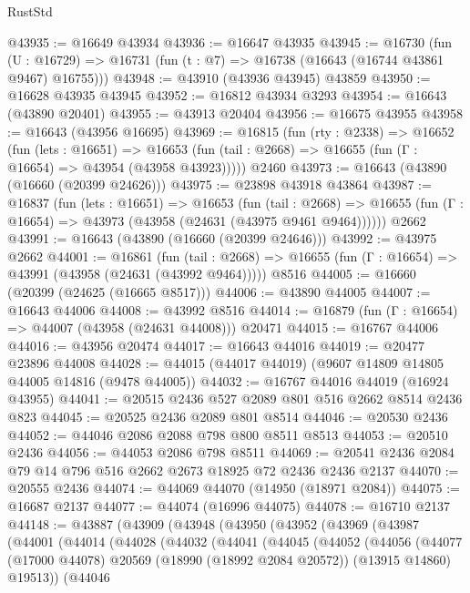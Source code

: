 \begin{lexlean}{RustStd}
\begin{coremodule}
@43935 := @16649 @43934
@43936 := @16647 @43935
@43945 := @16730
    (fun (U : @16729) => @16731 (fun (t : @7) => @16738 (@16643 (@16744 @43861 @9467) @16755)))
@43948 := @43910 (@43936 @43945) @43859
@43950 := @16628 @43935 @43945
@43952 := @16812 @43934 @3293
@43954 := @16643 (@43890 @20401)
@43955 := @43913 @20404
@43956 := @16675 @43955
@43958 := @16643 (@43956 @16695)
@43969 := @16815
    (fun (rty : @2338) =>
    @16652
      (fun (lets : @16651) =>
      @16653 (fun (tail : @2668) => @16655 (fun (Γ : @16654) => @43954 (@43958 @43923)))))
    @2460
@43973 := @16643 (@43890 (@16660 (@20399 @24626)))
@43975 := @23898 @43918 @43864
@43987 := @16837
    (fun (lets : @16651) =>
    @16653
      (fun (tail : @2668) =>
      @16655 (fun (Γ : @16654) => @43973 (@43958 (@24631 (@43975 @9461 @9464))))))
    @2662
@43991 := @16643 (@43890 (@16660 (@20399 @24646)))
@43992 := @43975 @2662
@44001 := @16861
    (fun (tail : @2668) => @16655 (fun (Γ : @16654) => @43991 (@43958 (@24631 (@43992 @9464)))))
    @8516
@44005 := @16660 (@20399 (@24625 (@16665 @8517)))
@44006 := @43890 @44005
@44007 := @16643 @44006
@44008 := @43992 @8516
@44014 := @16879 (fun (Γ : @16654) => @44007 (@43958 (@24631 @44008))) @20471
@44015 := @16767 @44006
@44016 := @43956 @20474
@44017 := @16643 @44016
@44019 := @20477 @23896 @44008
@44028 := @44015 (@44017 @44019) (@9607 @14809 @14805 @44005 @14816 (@9478 @44005))
@44032 := @16767 @44016 @44019 (@16924 @43955)
@44041 := @20515 @2436 @527 @2089 @801 @516 @2662 @8514 @2436 @823
@44045 := @20525 @2436 @2089 @801 @8514
@44046 := @20530 @2436
@44052 := @44046 @2086 @2088 @798 @800 @8511 @8513
@44053 := @20510 @2436
@44056 := @44053 @2086 @798 @8511
@44069 := @20541 @2436 @2084 @79 @14 @796 @516 @2662 @2673 @18925 @72 @2436 @2436 @2137
@44070 := @20555 @2436
@44074 := @44069 @44070 (@14950 (@18971 @2084))
@44075 := @16687 @2137
@44077 := @44074 (@16996 @44075)
@44078 := @16710 @2137
@44148 := @43887
    (@43909
      (@43948
        (@43950
          (@43952
            (@43969
              (@43987
                (@44001
                  (@44014
                    (@44028
                      (@44032
                        (@44041
                          (@44045
                            (@44052
                              (@44056
                                (@44077
                                  (@17000 @44078)
                                  @20569
                                  (@18990 (@18992 @2084 @20572))
                                  (@13915 @14860)
                                  @19513))
                              (@44046

\end{coremodule}
\end{lexlean}
